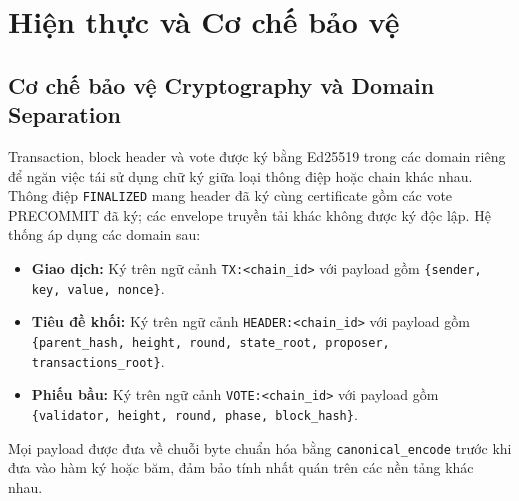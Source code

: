 \documentclass[10pt,a4paper]{report}
\begin{document}
\chapter{Hiện thực và Cơ chế bảo vệ}

\section{Cơ chế bảo vệ Cryptography và Domain Separation}
Transaction, block header và vote được ký bằng Ed25519 trong các domain riêng để ngăn việc tái sử dụng chữ ký giữa loại thông điệp hoặc chain khác nhau. Thông điệp \texttt{FINALIZED} mang header đã ký cùng certificate gồm các vote PRECOMMIT đã ký; các envelope truyền tải khác không được ký độc lập. Hệ thống áp dụng các domain sau:
\begin{itemize}
  \item \textbf{Giao dịch:} Ký trên ngữ cảnh \texttt{TX:<chain\_id>} với payload gồm \texttt{\{sender, key, value, nonce\}}.
  \item \textbf{Tiêu đề khối:} Ký trên ngữ cảnh \texttt{HEADER:<chain\_id>} với payload gồm \texttt{\{parent\_hash, height, round, state\_root, proposer, transactions\_root\}}.
  \item \textbf{Phiếu bầu:} Ký trên ngữ cảnh \texttt{VOTE:<chain\_id>} với payload gồm \texttt{\{validator, height, round, phase, block\_hash\}}.
\end{itemize}
Mọi payload được đưa về chuỗi byte chuẩn hóa bằng \texttt{canonical\_encode} trước khi đưa vào hàm ký hoặc băm, đảm bảo tính nhất quán trên các nền tảng khác nhau.
\end{document}
